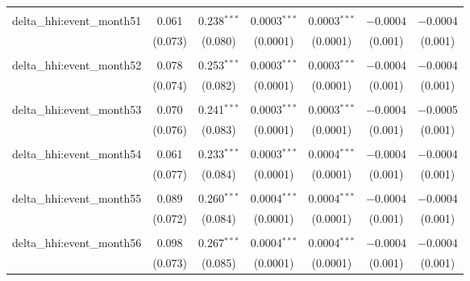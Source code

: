 \begin{table}[H]
{\begin{tabular}{@{\extracolsep{5pt}}lcccccc}
   & & & & & & \\  

  delta\_hhi:event\_month51 & 0.061 & 0.238$^{***}$ & 0.0003$^{***}$ & 0.0003$^{***}$ & $-$0.0004 & $-$0.0004 \\  

   & (0.073) & (0.080) & (0.0001) & (0.0001) & (0.001) & (0.001) \\  

   & & & & & & \\  

  delta\_hhi:event\_month52 & 0.078 & 0.253$^{***}$ & 0.0003$^{***}$ & 0.0003$^{***}$ & $-$0.0004 & $-$0.0004 \\  

   & (0.074) & (0.082) & (0.0001) & (0.0001) & (0.001) & (0.001) \\  

   & & & & & & \\  

  delta\_hhi:event\_month53 & 0.070 & 0.241$^{***}$ & 0.0003$^{***}$ & 0.0003$^{***}$ & $-$0.0004 & $-$0.0005 \\  

   & (0.076) & (0.083) & (0.0001) & (0.0001) & (0.001) & (0.001) \\  

   & & & & & & \\  

  delta\_hhi:event\_month54 & 0.061 & 0.233$^{***}$ & 0.0003$^{***}$ & 0.0004$^{***}$ & $-$0.0004 & $-$0.0004 \\  

   & (0.077) & (0.084) & (0.0001) & (0.0001) & (0.001) & (0.001) \\  

   & & & & & & \\  

  delta\_hhi:event\_month55 & 0.089 & 0.260$^{***}$ & 0.0004$^{***}$ & 0.0004$^{***}$ & $-$0.0004 & $-$0.0004 \\  

   & (0.072) & (0.084) & (0.0001) & (0.0001) & (0.001) & (0.001) \\  

   & & & & & & \\  

  delta\_hhi:event\_month56 & 0.098 & 0.267$^{***}$ & 0.0004$^{***}$ & 0.0004$^{***}$ & $-$0.0004 & $-$0.0004 \\  

   & (0.073) & (0.085) & (0.0001) & (0.0001) & (0.001) & (0.001) \\  


\end{tabular}}
\end{table}
